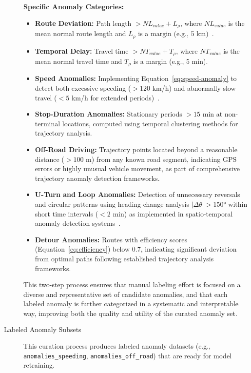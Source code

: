 \documentclass[runningheads]{llncs}
\begin{document}
\begin{description}
    \textbf{Specific Anomaly Categories:}
        \begin{itemize}[leftmargin=*]
            \item \textbf{Route Deviation:} Path length $> NL_{value} + L_\rho$, where $NL_{value}$ is the mean normal route length and $L_\rho$ is a margin (e.g., 5 km)~\cite{wangDetectingAnomalousTrajectories2018}.
            \item \textbf{Temporal Delay:} Travel time $> NT_{value} + T_\rho$, where $NT_{value}$ is the mean normal travel time and $T_\rho$ is a margin (e.g., 5 min).
            \item \textbf{Speed Anomalies:} Implementing Equation~\ref{eq:speed-anomaly} to detect both excessive speeding ($> 120$ km/h) and abnormally slow travel ($< 5$ km/h for extended periods)~\cite{heEnhancedDBSCANMultiple2020}.
            \item \textbf{Stop-Duration Anomalies:} Stationary periods $> 15$ min at non-terminal locations, computed using temporal clustering methods for trajectory analysis.
            \item \textbf{Off-Road Driving:} Trajectory points located beyond a reasonable distance ($> 100$ m) from any known road segment, indicating GPS errors or highly unusual vehicle movement, as part of comprehensive trajectory anomaly detection frameworks.
            \item \textbf{U-Turn and Loop Anomalies:} Detection of unnecessary reversals and circular patterns using heading change analysis $|\Delta\theta| > 150°$ within short time intervals ($< 2$ min) as implemented in spatio-temporal anomaly detection systems~\cite{heEnhancedDBSCANMultiple2020}.
            \item \textbf{Detour Anomalies:} Routes with efficiency scores (Equation~\ref{eq:efficiency}) below 0.7, indicating significant deviation from optimal paths following established trajectory analysis frameworks.
        \end{itemize}
    This two-step process ensures that manual labeling effort is focused on a diverse and representative set of candidate anomalies, and that each labeled anomaly is further categorized in a systematic and interpretable way, improving both the quality and utility of the curated anomaly set.
    \item[Labeled Anomaly Subsets] This curation process produces labeled anomaly datasets (e.g., \texttt{anomalies\_speeding}, \texttt{anomalies\_off\_road}) that are ready for model retraining.
\end{description}
\end{document}
